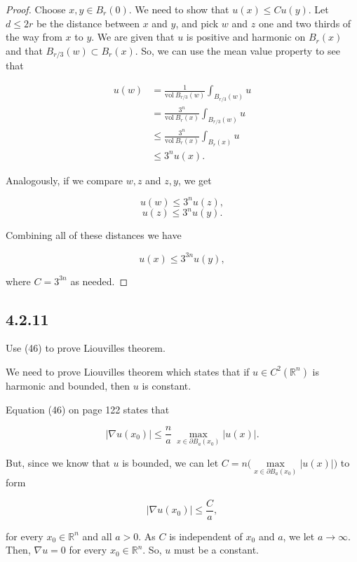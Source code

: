 \documentclass{article}
\begin{document}
\begin{proof} Choose $x,y\in B_r(0)$. We need to show that $u(x) \leq Cu(y)$. Let $d \leq 2r$ be the distance between $x$ and $y$, and pick $w$ and $z$ one and two thirds of the way from $x$ to $y$. We are given that $u$ is positive and harmonic on $B_r(x)$ and that $B_{r/3}(w)\subset B_r(x)$. So, we can use the mean value property to see that

\begin{equation*}
\begin{split}
u(w) &= \frac{1}{\text{vol}~ B_{r/3}(w)}\int_{B_{r/3}(w)}u \\&=
\frac{3^n}{\text{vol}~ B_{r}(x)}\int_{B_{r/3}(w)}u  \\& \leq
\frac{3^n}{\text{vol}~ B_{r}(x)}\int_{B_{r}(x)}u  \\& \leq
3^n{u(x)}.
\end{split}
\end{equation*}

Analogously, if we compare $w,z$ and $z,y$, we get

$$u(w)\leq 3^n{u(z)},$$
$$u(z)\leq 3^n{u(y)}.$$

Combining all of these distances we have

$$u(x)\leq 3^{3n}u(y),$$

where $C=3^{3n}$ as needed.
\end{proof}

\subsection{\textbf{4.2.11}} Use (46) to prove Liouville\textsc{}s theorem.

We need to prove Liouville\textsc{}s theorem which states that if $u\in C^2(\mathbb R^n)$ is harmonic and bounded, then $u$ is constant.

Equation (46) on page 122 states that

$$|\nabla u(x_0)|\leq \frac{n}{a}~\underset{x\in\partial B_a(x_0)}{\max}|u(x)|.$$

But, since we know that $u$ is bounded, we can let $C=n\bigg(\underset{x\in\partial B_a(x_0)}{\max}|u(x)|\bigg)$ to form

$$|\nabla u(x_0)|\leq \frac{C}{a},$$

for every $x_0 \in \mathbb R^n$ and all $a > 0$. As $C$ is independent of $x_0$ and $a$, we let $a\to\infty$. Then, $\nabla u=0$ for every $x_0 \in \mathbb R^n$. So, $u$ must be a constant.
\end{document}
